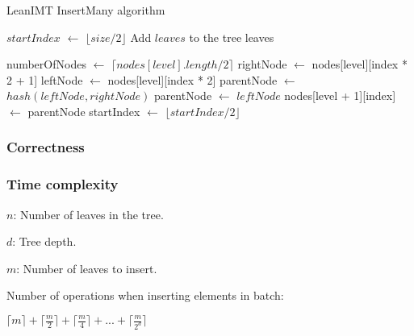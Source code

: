 \documentclass{article}
\begin{document}
\begin{algorithm}[H]
    \caption{LeanIMT InsertMany algorithm}\label{insertMany}
    \begin{algorithmic}[1]
        \State $startIndex$ $\gets$ $\lfloor size/2 \rfloor$ 
        \State Add $leaves$ to the tree leaves

        \State numberOfNodes $\gets$ $\lceil nodes[level].length / 2 \rceil$ 
        \State rightNode $\gets$ nodes[level][index * 2 + 1] 
        \State leftNode $\gets$ nodes[level][index * 2] 
        \State parentNode $\gets$ $hash(leftNode, rightNode)$
        \Else
        \State parentNode $\gets$ $leftNode$
        \EndIf
        \State nodes[level + 1][index] $\gets$ parentNode 
        \EndFor
        \State startIndex $\gets$ $\lfloor startIndex/2 \rfloor$ 
        \EndFor
        \EndProcedure
    \end{algorithmic}
\end{algorithm}



\subsubsection{Correctness}



\subsubsection{Time complexity}

$n$: Number of leaves in the tree.

$d$: Tree depth.

$m$: Number of leaves to insert.



Number of operations when inserting elements in batch:



$\lceil m \rceil + \lceil \frac{m}{2} \rceil + \lceil \frac{m}{4} \rceil + ... + \lceil \frac{m}{2^d} \rceil$
\end{document}
